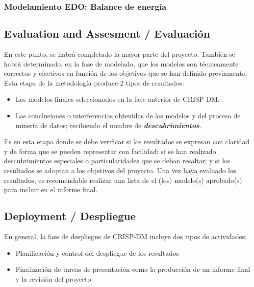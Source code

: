 \subsubsection{Modelamiento EDO: Balance de energía}


\subsection{Evaluation and Assesment / Evaluación} 

En este punto, se habrá completado la mayor parte del proyecto. También se habrá determinado, en la fase de modelado, que los modelos son técnicamente correctos y efectivos en función de los objetivos que se han definido previamente. Esta etapa de la metodología produce 2 tipos de resultados: \begin{itemize}
    \item Los modelos finales seleccionados en la fase anterior de CRISP-DM.
    \item Las conclusiones o interferencias obtenidas de los modelos y del proceso de minería de datos; recibiendo el nombre de \textit{\textbf{descubrimientos}}.
\end{itemize}

Es en esta etapa donde se debe verificar si los resultados se expresan con claridad y de forma que se pueden representar con facilidad; si se han realizado descubrimientos especiales o particularidades que se deban resaltar; y si los resultados se adaptan a los objetivos del proyecto. Una vez haya evaluado los resultados, es recomendable realizar una lista de el (los) modelo(s) aprobado(s) para incluir en el informe final.


\subsection{Deployment / Despliegue} 
En general, la fase de despliegue de CRISP-DM incluye dos tipos de actividades:
\begin{itemize}
    \item Planificación y control del despliegue de los resultados
    \item Finalización de tareas de presentación como la producción de un informe final y la revisión del proyecto
\end{itemize}
